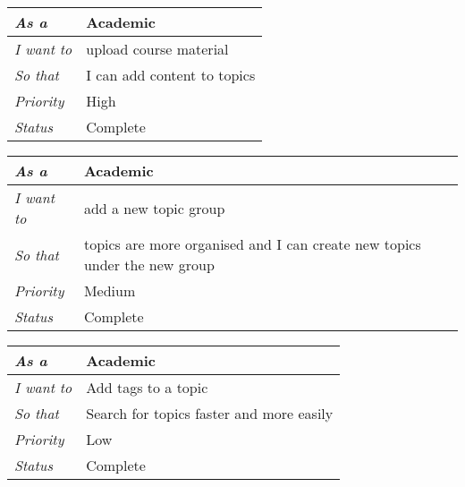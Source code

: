 \begin{table}[hp]
\begin{tabular}{ll}
\textit{As a}      & Academic                       \\ \hline
\textit{I want to} & upload course material      \\ \hline
\textit{So that}   & I can add content to topics       \\ \hline
\textit{Priority}  & {\color[HTML]{FE0000} High} \\ \hline
\textit{Status}    & Complete                    \\ \hline 
\end{tabular}
\end{table}

\begin{table}[hp]
\begin{tabular}{|l|l|}
\hline
\textit{As a}      & Academic                                                                      \\ \hline
\textit{I want to} & add a new topic group                                                     \\ \hline
\textit{So that}   & topics are more organised and I can create new topics under the new group \\ \hline
\textit{Priority}  & {\color[HTML]{F8A102} Medium}                                             \\ \hline
\textit{Status}    & Complete                                                                  \\ \hline
\end{tabular}
\end{table}

\begin{table}[hp]
\begin{tabular}{|l|l|}
\hline
\textit{As a}      & Academic                                 \\ \hline
\textit{I want to} & Add tags to a topic                      \\ \hline
\textit{So that}   & Search for topics faster and more easily \\ \hline
\textit{Priority}  & {\color[HTML]{3531FF} Low}               \\ \hline
\textit{Status}    & Complete                                 \\ \hline
\end{tabular}
\end{table}

